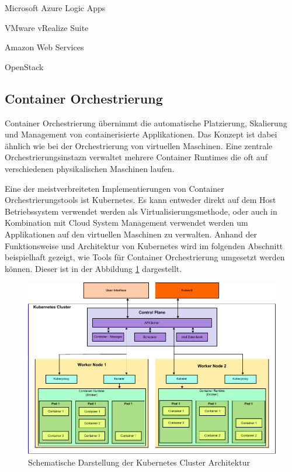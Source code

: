 Microsoft Azure Logic Apps

VMware vRealize Suite

Amazon Web Services

OpenStack



\subsection{Container Orchestrierung}

Container Orchestrierung übernimmt die automatische Platzierung, Skalierung und Management von containerisierte Applikationen. Das Konzept ist dabei ähnlich wie bei der Orchestrierung von virtuellen Maschinen. Eine zentrale Orchestrierungsinstazn verwaltet mehrere Container Runtimes die oft auf verschiedenen physikalischen Maschinen laufen.

Eine der meistverbreiteten Implementierungen von Container Orchestrierungstools ist Kubernetes. Es kann entweder direkt auf dem Host Betriebssystem verwendet werden als Virtualisierungsmethode, oder auch in Kombination mit Cloud System Management verwendet werden um Applikationen auf den virtuellen Maschinen zu verwalten. Anhand der Funktionsweise und Architektur von Kubernetes wird im folgenden Abschnitt beispielhaft gezeigt, wie Tools für Container Orchestrierung umgesetzt werden können. Dieser ist in der Abbildung \ref{kubernetes_arch} dargestellt.

\begin{figure}[htbp]
	\centering
	\includegraphics[width=\textwidth]{./content/graphics/kubernetes_arch.pdf}
	\caption{Schematische Darstellung der Kubernetes Cluster Architektur}
	\label{kubernetes_arch}
\end{figure}

